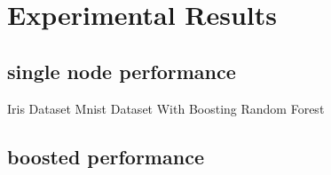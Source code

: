 \chapter{Experimental Results}

\section{single node performance}
Iris Dataset
Mnist Dataset
With Boosting Random Forest

\section{boosted performance}

